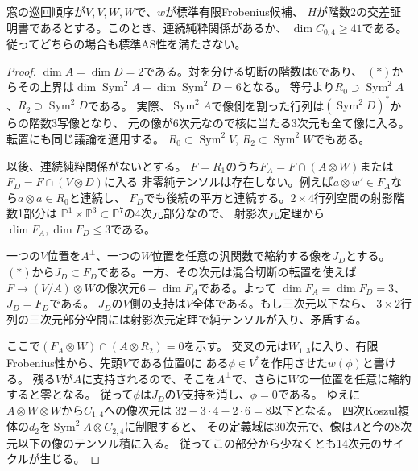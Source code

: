 \begin{proposition}[隣接する二対の四次障害]\label{prop:adjacent-position-pairs}
窓の巡回順序が$V,V,W,W$で、$w$が標準有限Frobenius候補、
$H$が階数2の交差証明書であるとする。このとき、連続純粋関係があるか、
$\dim C_{0,4}\ge41$である。従ってどちらの場合も標準AS性を満たさない。
\end{proposition}
\begin{proof}
$\dim A=\dim D=2$である。対を分ける切断の階数は6であり、
$(*)$からその上界は$\dim\operatorname{Sym}^2 A+\dim\operatorname{Sym}^2 D=6$となる。
等号より$R_0\supset\operatorname{Sym}^2 A$、$R_2\supset\operatorname{Sym}^2 D$である。
実際、$\operatorname{Sym}^2 A$で像側を割った行列は$(\operatorname{Sym}^2 D)^*$からの階数3写像となり、
元の像が6次元なので核に当たる3次元も全て像に入る。転置にも同じ議論を適用する。
$R_0\subset\operatorname{Sym}^2 V$, $R_2\subset\operatorname{Sym}^2 W$でもある。

以後、連続純粋関係がないとする。
$F=R_1$のうち$F_A=F\cap(A\otimes W)$または$F_D=F\cap(V\otimes D)$に入る
非零純テンソルは存在しない。例えば$a\otimes w'\in F_A$なら$a\otimes a\in R_0$と連続し、
$F_D$でも後続の平方と連続する。$2\times4$行列空間の射影階数1部分は
$\mathbb P^1\times\mathbb P^3\subset\mathbb P^7$の4次元部分なので、
射影次元定理から$\dim F_A,\dim F_D\le3$である。

一つの$V$位置を$A^\perp$、一つの$W$位置を任意の汎関数で縮約する像を$J_D$とする。
$(*)$から$J_D\subset F_D$である。一方、その次元は混合切断の転置を使えば
$F\to(V/A)\otimes W$の像次元$6-\dim F_A$である。よって
$\dim F_A=\dim F_D=3$、$J_D=F_D$である。
$J_D$の$V$側の支持は$V$全体である。もし三次元以下なら、
$3\times2$行列の三次元部分空間には射影次元定理で純テンソルが入り、矛盾する。

ここで$(F_A\otimes W)\cap(A\otimes R_2)=0$を示す。
交叉の元は$W_{1,3}$に入り、有限Frobenius性から、先頭$V$である位置0に
ある$\phi\in V^*$を作用させた$w(\phi)$と書ける。
残る$V$が$A$に支持されるので、そこを$A^\perp$で、さらに$W$の一位置を任意に縮約すると零となる。
従って$\phi$は$J_D$の$V$支持を消し、$\phi=0$である。
ゆえに$A\otimes W\otimes W$から$C_{1,4}$への像次元は
$32-3\cdot4-2\cdot6=8$以下となる。
四次Koszul複体の$d_2$を$\operatorname{Sym}^2 A\otimes C_{2,4}$に制限すると、
その定義域は30次元で、像は$A$と今の8次元以下の像のテンソル積に入る。
従ってこの部分から少なくとも14次元のサイクルが生じる。


\end{proof}
